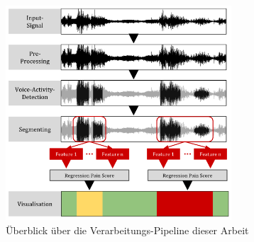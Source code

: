 \begin{figure}[H]
	\centering
	\includegraphics[width=0.75\textwidth]{bilder/pipeline01.png}
	\caption{Überblick über die Verarbeitungs-Pipeline dieser Arbeit}
	\label{img:architecture-overview}
\end{figure}